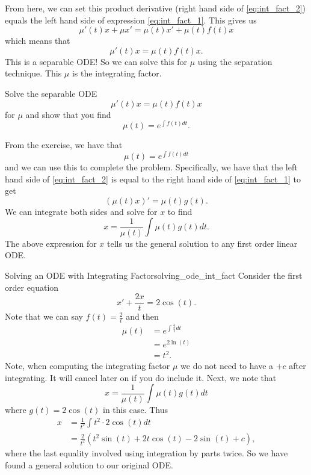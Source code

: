         From here, we can set this product derivative (right hand side of \ref{eq:int_fact_2}) equals the left hand side of expression \ref{eq:int_fact_1}.  This gives us
        \[
        \mu'(t)x+\mu x' = \mu(t)x'+\mu(t) f(t) x
        \]
        which means that
        \[
        \mu'(t)x=\mu(t) f(t) x.
        \]
        This is a separable ODE! So we can solve this for $\mu$ using the separation technique. This $\mu$ is the integrating factor.

        \begin{exercise}
            Solve the separable ODE
            \[
            \mu'(t)x=\mu(t)f(t)x
            \]
            for $\mu$ and show that you find
            \[
            \mu(t) = e^{\int f(t)dt}.
            \]
        \end{exercise}

        \noindent From the exercise, we have that
        \[
        \mu(t)=e^{\int f(t)dt}
        \]
        and we can use this to complete the problem.  Specifically, we have that the left hand side of \ref{eq:int_fact_2} is equal to the right hand side of \ref{eq:int_fact_1} to get
        \[
        (\mu(t) x)' = \mu(t)g(t).
        \]
        We can integrate both sides and solve for $x$ to find
        \[
        \boxed{x = \frac{1}{\mu(t)}\int \mu(t) g(t)dt.}
        \]
        The above expression for $x$ tells us the general solution to any first order linear ODE.

        \begin{ex}{Solving an ODE with Integrating Factor}{solving_ode_int_fact}
            Consider the first order equation
            \[
            x'+\frac{2x}{t}=2\cos(t).
            \]
            Note that we can say $f(t)=\frac{2}{t}$ and then
            \begin{align*}
            \mu(t)&=e^{\int \frac{2}{t}dt}\\
            &= e^{2\ln(t)}\\
            &=t^2.
            \end{align*}
            Note, when computing the integrating factor $\mu$ we do not need to have a $+c$ after integrating. It will cancel later on if you do include it. Next, we note that
            \[
            x=\frac{1}{\mu(t)} \int \mu(t) g(t)dt
            \]
            where $g(t)=2\cos(t)$ in this case.  Thus
            \begin{align*}
                x&=\frac{1}{t^2} \int t^2 \cdot 2\cos(t)dt\\
                &=\frac{2}{t^2} \left(t^2\sin(t)+2t\cos(t)-2\sin(t)+c\right),
            \end{align*}
            where the last equality involved using integration by parts twice.  So we have found a general solution to our original ODE.
        \end{ex}

